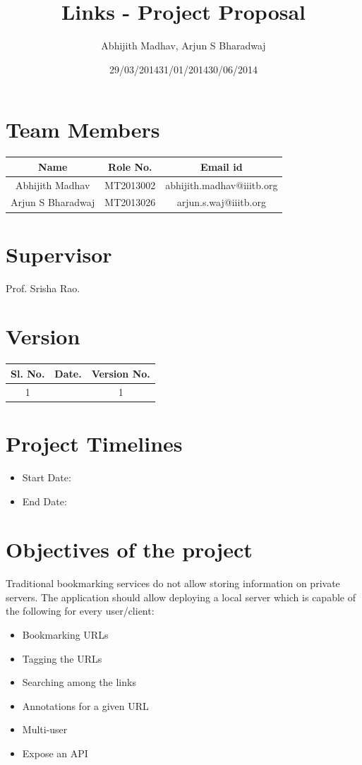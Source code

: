 \documentclass[11pt]{report} %
\title{Links - Project Proposal}
\author{Abhijith Madhav, Arjun S Bharadwaj}
\date{} %
\begin{document}
\maketitle
\section*{Team Members}
\begin{tabular}{ | c | c | c | }
\hline            
  Name & Role No. & Email id \\
  \hline  
  \hline  
  Abhijith Madhav & MT2013002 & abhijith.madhav@iiitb.org \\
  \hline  
  Arjun S Bharadwaj & MT2013026 & arjun.s.waj@iiitb.org \\  
\hline  
\end{tabular}

\section*{Supervisor}
Prof. Srisha Rao.

\section*{Version}
\begin{tabular}{ | c | c | c | }
\hline            
  Sl. No. & Date. & Version No. \\
\hline  
\hline  
  1 & \date{29/03/2014} & 1 \\
\hline  
\end{tabular}

\section*{Project Timelines}
\begin{itemize}
\item
Start Date: \date{31/01/2014}
\item
End Date: \date{30/06/2014}
\end{itemize}

\section*{Objectives of the project}
Traditional bookmarking services do not allow storing information on private servers. The application should allow deploying a local server which is capable of the following for every user/client:
\begin{itemize}
\item
Bookmarking URLs
\item
Tagging the URLs
\item
Searching among the links
\item
Annotations for a given URL
\item
Multi-user
\item
Expose an API
\end{itemize}
\end{document}
